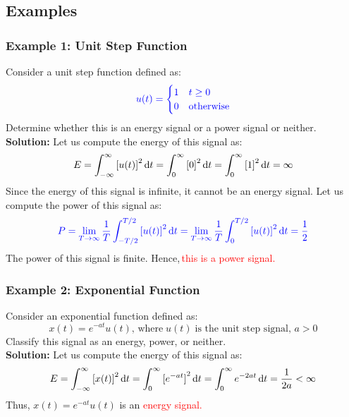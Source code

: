 \documentclass[../notes-main.tex]{subfiles}
\begin{document}
\subsection{Examples}
\subsubsection{Example 1: Unit Step Function}
Consider a unit step function defined as:
\begin{equation}
    \textcolor{blue}{u(t) =
        \begin{cases}
            1 & t \geq 0         \\
            0 & \text{otherwise}
        \end{cases}}
        \label{eq:unit-step-function-example}
\end{equation}
Determine whether this is an energy signal or a power signal or neither.\\
\noindent \textbf{Solution:} Let us compute the energy of this signal as:
\begin{equation}
    E = \int_{-\infty}^{\infty} {[u(t)]}^2 \dif t = \int_{0}^{\infty} {[0]}^2 \dif t = \int_{0}^{\infty} {[1]}^2 \dif t = \infty
    \label{eq:unit-step-energy}
\end{equation}
Since the energy of this signal is infinite, it cannot be an energy signal. Let us compute the power of this signal as:
\begin{equation}
    \textcolor{blue}{P = \lim_{T \to \infty} \frac{1}{T} \int_{-T/2}^{T/2} {[u(t)]}^2 \dif t = \lim_{T \to \infty} \frac{1}{T} \int_{0}^{T/2} {[u(t)]}^2 \dif t = \frac{1}{2}}
    \label{eq:unit-step-power}
\end{equation}
The power of this signal is finite. Hence,\,\textcolor{red}{this is a power signal.}

\subsubsection{Example 2: Exponential Function}
Consider an exponential function defined as:
\begin{equation}
    x(t) = e^{-at}u(t), \, \text{where} \; u(t) \;\text{is the unit step signal},\, a > 0
    \label{eq:exp-function-example}
\end{equation}
Classify this signal as an energy, power, or neither.\\
\noindent \textbf{Solution:} Let us compute the energy of this signal as:
\begin{equation}
    E = \int_{-\infty}^{\infty} {[x(t)]}^2 \dif t = \int_{0}^{\infty} {[e^{-at}]}^2 \dif t = \int_{0}^{\infty} e^{-2at} \dif t = \frac{1}{2a} < \infty
    \label{eq:exp-function-energy}
\end{equation}
Thus, \(x(t) = e^{-at}u(t)\) is an \textcolor{red}{energy signal.}
\end{document}
